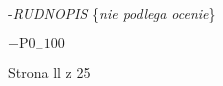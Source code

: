 \documentclass[a4paper,12pt]{article}
\begin{document}
-{\it RUDNOPIS} \{{\it nie podlega ocenie}\}

$-\mathrm{P}0_{-}100$

Strona ll z 25
\end{document}
